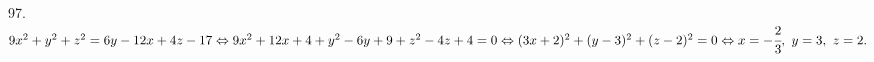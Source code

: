 97. $9x^2+y^2+z^2=6y-12x+4z-17\Leftrightarrow9x^2+12x+4+y^2-6y+9+z^2-4z+4=0\Leftrightarrow(3x+2)^2+(y-3)^2+(z-2)^2=0\Leftrightarrow
x=-\cfrac{2}{3},\ y=3,\ z=2.$\\
